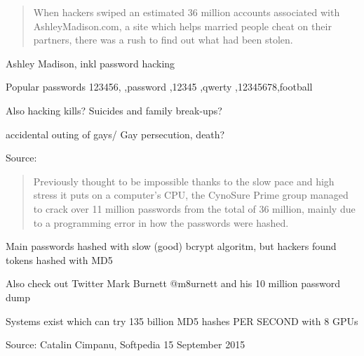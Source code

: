 \documentclass[20pt,landscape,a4paper,footrule]{foils}
\begin{document}


\begin{quote}
When hackers swiped an estimated 36 million accounts associated with AshleyMadison.com, a site which helps married people cheat on their partners, there was a rush to find out what had been stolen.
\end{quote}


\begin{list2}
\item Ashley Madison, inkl password hacking
\item Popular passwords
123456,
,password
,12345
,qwerty
,12345678,football
\item Also hacking kills? Suicides and family break-ups?
\item accidental outing of gays/ Gay persecution, death?
\end{list2}

Source:\\
{\footnotesize{}}


\begin{quote}
Previously thought to be impossible thanks to the slow pace and high stress it puts on a computer's CPU, the CynoSure Prime group managed to crack over 11 million passwords from the total of 36 million, mainly due to a programming error in how the passwords were hashed.
\end{quote}


\begin{list2}
\item Main passwords hashed with slow (good) bcrypt  algoritm, but hackers found tokens hashed with MD5\\
\item Also check out Twitter Mark Burnett @m8urnett and his 10 million password dump\\
\item Systems exist which can try 135 billion MD5 hashes PER SECOND with 8 GPUs
\end{list2}

Source: Catalin Cimpanu, Softpedia 15 September 2015\\
{\footnotesize{}}
\end{document}
